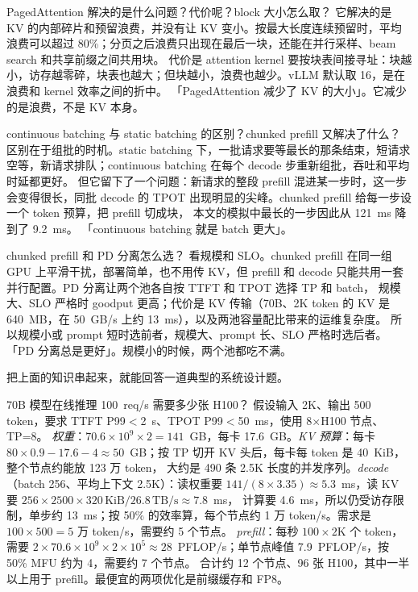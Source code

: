 \begin{qa}{PagedAttention 解决的是什么问题？代价呢？block 大小怎么取？}
\ans 它解决的是 KV 的内部碎片和预留浪费，并没有让 KV 变小。按最大长度连续预留时，平均浪费可以超过 80\%；分页之后浪费只出现在最后一块，还能在并行采样、beam search 和共享前缀之间共用块。
代价是 attention kernel 要按块表间接寻址：块越小，访存越零碎，块表也越大；但块越小，浪费也越少。vLLM 默认取 16，是在浪费和 kernel 效率之间的折中。
\wrong 「PagedAttention 减少了 KV 的大小」。它减少的是浪费，不是 KV 本身。
\end{qa}

\begin{qa}{continuous batching 与 static batching 的区别？chunked prefill 又解决了什么？}
\ans 区别在于组批的时机。static batching 下，一批请求要等最长的那条结束，短请求空等，新请求排队；continuous batching 在每个 decode 步重新组批，吞吐和平均时延都更好。
但它留下了一个问题：新请求的整段 prefill 混进某一步时，这一步会变得很长，同批 decode 的 TPOT 出现明显的尖峰。chunked prefill 给每一步设一个 token 预算，把 prefill 切成块，
本文的模拟中最长的一步因此从 121~ms 降到了 9.2~ms。
\wrong 「continuous batching 就是 batch 更大」。
\end{qa}

\begin{qa}{chunked prefill 和 PD 分离怎么选？}
\ans 看规模和 SLO。chunked prefill 在同一组 GPU 上平滑干扰，部署简单，也不用传 KV，但 prefill 和 decode 只能共用一套并行配置。PD 分离让两个池各自按 TTFT 和 TPOT 选择 TP 和 batch，
规模大、SLO 严格时 goodput 更高；代价是 KV 传输（70B、2K token 的 KV 是 640~MB，在 50~GB/s 上约 13~ms），以及两池容量配比带来的运维复杂度。
所以规模小或 prompt 短时选前者，规模大、prompt 长、SLO 严格时选后者。
\wrong 「PD 分离总是更好」。规模小的时候，两个池都吃不满。
\end{qa}

把上面的知识串起来，就能回答一道典型的系统设计题。

\begin{est}{70B 模型在线推理 100~req/s 需要多少张 H100？}
假设输入 2K、输出 500 token，要求 TTFT P99$<$2~s、TPOT P99$<$50~ms，使用 8$\times$H100 节点、TP=8。
\emph{权重}：$70.6\times10^9\times2=141$~GB，每卡 17.6~GB。\emph{KV 预算}：每卡 $80\times0.9-17.6-4\approx50$~GB；按 TP 切开 KV 头后，每卡每 token 是 40~KiB，整个节点约能放 123 万 token，
大约是 490 条 2.5K 长度的并发序列。\emph{decode}（batch 256、平均上下文 2.5K）：读权重要 $141/(8\times3.35)\approx5.3$~ms，读 KV 要 $256\times2500\times320\,\text{KiB}/26.8\,\text{TB/s}\approx7.8$~ms，
计算要 4.6~ms，所以仍受访存限制，单步约 13~ms；按 50\% 的效率算，每个节点约 1 万 token/s。需求是 $100\times500=5$ 万 token/s，需要约 5 个节点。
\emph{prefill}：每秒 $100\times2\text{K}$ 个 token，需要 $2\times70.6\times10^9\times2\times10^5\approx28$~PFLOP/s；单节点峰值 7.9~PFLOP/s，按 50\% MFU 约为 4，需要约 7 个节点。
合计约 12 个节点、96 张 H100，其中一半以上用于 prefill。最便宜的两项优化是前缀缓存和 FP8。
\end{est}

